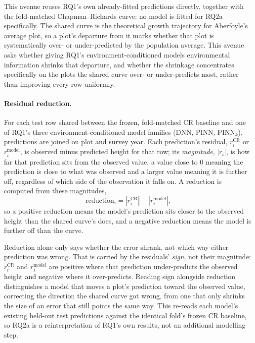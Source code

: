 \documentclass[11pt,a4paper]{report}
\begin{document}
This avenue reuses RQ1's own already-fitted predictions directly, together with the fold-matched
Chapman--Richards curve: no model is fitted for RQ2a specifically. The
shared curve is the theoretical growth trajectory for Aberfoyle's average plot, so a plot's
departure from it marks whether that plot is systematically over- or under-predicted by the
population average. This avenue asks whether giving RQ1's environment-conditioned models
environmental information shrinks that departure, and whether the shrinkage concentrates
specifically on the plots the shared curve over- or under-predicts most, rather than improving
every row uniformly.

\paragraph*{Residual reduction.}
For each test row shared between the frozen, fold-matched CR baseline
and one of RQ1's three environment-conditioned model families (DNN, PINN, PINN$_k$), predictions
are joined on plot and survey year. Each prediction's residual, $r_i^{\text{CR}}$ or
$r_i^{\text{model}}$, is observed minus predicted height for that row; its \emph{magnitude},
$|r_i|$, is how far that prediction sits from the observed value, a value close to 0 meaning the
prediction is close to what was observed and a larger value meaning it is further off, regardless
of which side of the observation it falls on. A reduction is computed from these magnitudes,
\begin{equation}
\text{reduction}_i = \left|r_i^{\text{CR}}\right| - \left|r_i^{\text{model}}\right|,
\label{eq:residual-reduction}
\end{equation}
so a positive reduction means the model's prediction sits closer to the observed height than the
shared curve's does, and a negative reduction means the model is further off than the curve.

Reduction alone only says whether the error shrank, not which way either prediction was wrong.
That is carried by the residuals' \emph{sign}, not their magnitude: $r_i^{\text{CR}}$ and
$r_i^{\text{model}}$ are positive where that prediction under-predicts the observed height and
negative where it over-predicts. Reading sign alongside reduction distinguishes a model that moves
a plot's prediction toward the observed value, correcting the direction the shared curve got
wrong, from one that only shrinks the size of an error that still points the same way. This
re-reads each model's existing held-out test predictions against the identical fold's frozen CR
baseline, so RQ2a is a reinterpretation of RQ1's own results, not an additional modelling step.
\end{document}
